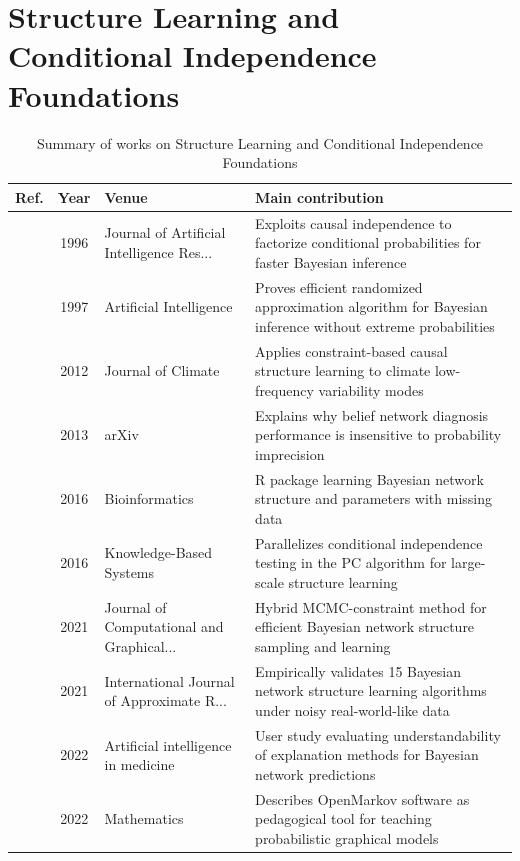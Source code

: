 \section{Structure Learning and Conditional Independence Foundations}\label{sec:theme3}
\begin{table}[!t]
\centering
\renewcommand{\arraystretch}{1.2}
\caption{Summary of works on Structure Learning and Conditional Independence Foundations}\label{tab:theme3}
\begin{tabularx}{\textwidth}{@{}l c p{3.6cm} X@{}}
\toprule
\textbf{Ref.} & \textbf{Year} & \textbf{Venue} & \textbf{Main contribution} \\
\midrule
\cite{zhang1996exploiting} & 1996 & Journal of Artificial Intelligence Res... & Exploits causal independence to factorize conditional probabilities for faster Bayesian inference \\
\cite{dagum1997optimal} & 1997 & Artificial Intelligence & Proves efficient randomized approximation algorithm for Bayesian inference without extreme probabilities \\
\cite{ebertuphoff2012causal} & 2012 & Journal of Climate & Applies constraint-based causal structure learning to climate low-frequency variability modes \\
\cite{henrion2013why} & 2013 & arXiv & Explains why belief network diagnosis performance is insensitive to probability imprecision \\
\cite{franzin2016bnstruct} & 2016 & Bioinformatics & R package learning Bayesian network structure and parameters with missing data \\
\cite{madsen2016parallel} & 2016 & Knowledge-Based Systems & Parallelizes conditional independence testing in the PC algorithm for large-scale structure learning \\
\cite{kuipers2021efficient} & 2021 & Journal of Computational and Graphical... & Hybrid MCMC-constraint method for efficient Bayesian network structure sampling and learning \\
\cite{constantinou2021large} & 2021 & International Journal of Approximate R... & Empirically validates 15 Bayesian network structure learning algorithms under noisy real-world-like data \\
\cite{butz2022investigating} & 2022 & Artificial intelligence in medicine & User study evaluating understandability of explanation methods for Bayesian network predictions \\
\cite{diez2022teaching} & 2022 & Mathematics & Describes OpenMarkov software as pedagogical tool for teaching probabilistic graphical models \\

\end{tabularx}
\end{table}
